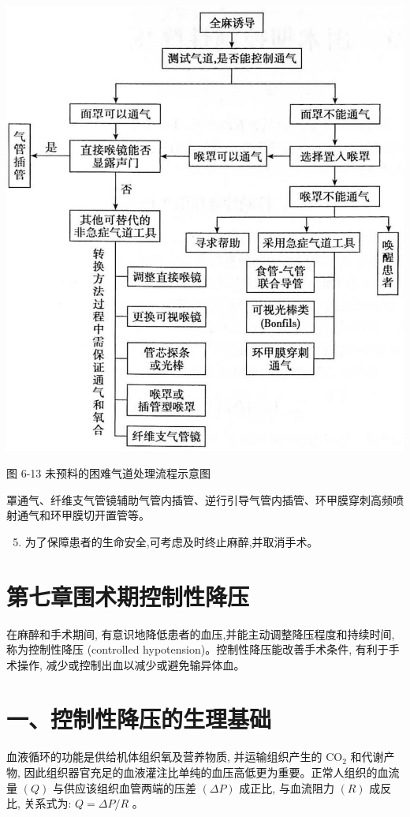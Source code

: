 \documentclass[10pt]{article}
\begin{document}
\begin{center}
\includegraphics[max width=\textwidth]{2024_07_09_002a177993bd97d1d6d7g-098}
\end{center}

图 6-13 未预料的困难气道处理流程示意图

罩通气、纤维支气管镜辅助气管内插管、逆行引导气管内插管、环甲膜穿刺高频喷射通气和环甲膜切开置管等。

\begin{enumerate}
  \setcounter{enumi}{4}
  \item 为了保障患者的生命安全,可考虑及时终止麻醉,并取消手术。
\end{enumerate}

\section*{第七章围术期控制性降压}
在麻醉和手术期间, 有意识地降低患者的血压,并能主动调整降压程度和持续时间,称为控制性降压 (controlled hypotension)。控制性降压能改善手术条件, 有利于手术操作, 减少或控制出血以减少或避免输异体血。

\section*{一、控制性降压的生理基础}
血液循环的功能是供给机体组织氧及营养物质, 并运输组织产生的 $\mathrm{CO}_{2}$ 和代谢产物, 因此组织器官充足的血液灌注比单纯的血压高低更为重要。正常人组织的血流量 $(Q)$ 与供应该组织血管两端的压差 $(\Delta P)$ 成正比, 与血流阻力 $(R)$ 成反比, 关系式为: $Q=\Delta P / R$ 。
\end{document}
